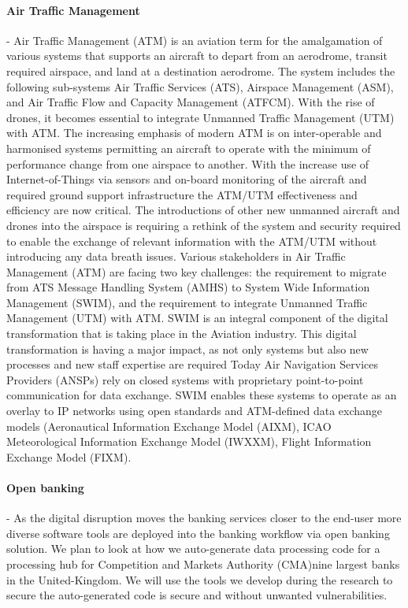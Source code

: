 \documentclass[a4paper,11pt]{article}
\begin{document}
\paragraph{Air Traffic Management}
\label{sec:atm}
- Air Traffic Management (ATM) is an aviation term for the amalgamation of various systems that supports an aircraft to depart from an aerodrome, transit required airspace, and land at a destination aerodrome. The system includes the following sub-systems Air Traffic Services (ATS), Airspace Management (ASM), and Air Traffic Flow and Capacity Management (ATFCM). With the rise of drones, it becomes essential to integrate Unmanned Traffic Management (UTM) with ATM. The increasing emphasis of modern ATM is on inter-operable and harmonised systems permitting an aircraft to operate with the minimum of performance change from one airspace to another. With the increase use of Internet-of-Things via sensors and on-board monitoring of the aircraft and required ground support infrastructure the ATM/UTM effectiveness and efficiency are now critical. The introductions of other new unmanned aircraft and drones into the airspace is requiring a rethink of the system and security required to enable the exchange of relevant information with the ATM/UTM without introducing any data breath issues. 
Various stakeholders in Air Traffic Management (ATM) are facing two key challenges: the requirement to migrate from ATS Message Handling System (AMHS) to System Wide Information Management (SWIM), and the requirement to integrate Unmanned Traffic Management (UTM) with ATM. SWIM is an integral component of the digital transformation that is taking place in the Aviation industry. This digital transformation is having a major impact, as not only systems but also new processes and new staff expertise are required Today Air Navigation Services Providers (ANSPs) rely on closed systems with proprietary point-to-point communication for data exchange. SWIM enables these systems to operate as an overlay to IP networks using open standards and ATM-defined data exchange models (Aeronautical Information Exchange Model (AIXM), ICAO Meteorological Information Exchange Model (IWXXM), Flight Information Exchange Model (FIXM). 

\paragraph{Open banking}
\label{sec:banking}
- As the digital disruption moves the banking services closer to the end-user more diverse software tools are deployed into the banking workflow via open banking solution. We plan to look at how we auto-generate data processing code for a processing hub for Competition and Markets Authority (CMA)nine largest banks in the United-Kingdom. We will use the tools we develop during the research to secure the auto-generated code is secure and without unwanted vulnerabilities.
\end{document}
